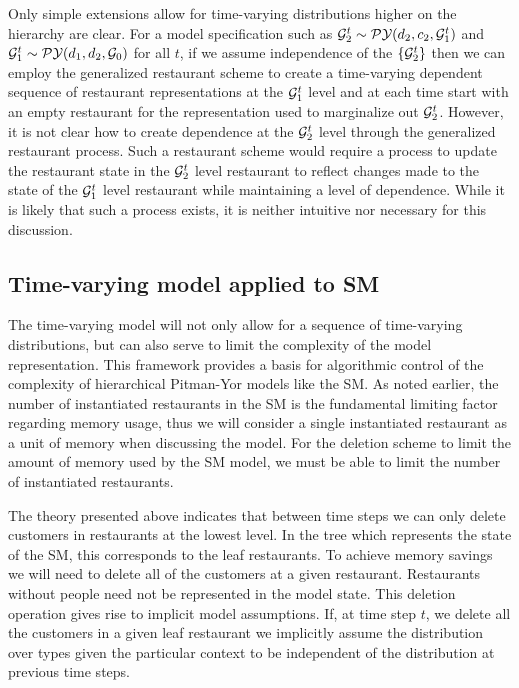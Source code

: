 Only simple extensions allow for time-varying distributions higher on the hierarchy are clear.  For a model specification such as $\G_2^t \sim \PY(d_2, c_2, \G_1^t)$ and $\G_1^t  \sim \PY(d_1,d_2,\G_0)$ for all $t$, if we assume independence of the $\{ \G_2^t \}$ then we can employ the generalized restaurant scheme to create a time-varying dependent sequence of restaurant representations at the  $\G_1^t$ level and at each time start with an empty restaurant for the representation used to marginalize out $\G_2^t$.  However, it is not clear how to create dependence at the $\G_2^t$ level through the generalized restaurant process.  Such a restaurant scheme would require a process to update the restaurant state in the $\G_2^t$ level restaurant to reflect changes made to the state of the $\G_1^t$ level restaurant while maintaining a level of dependence.  While it is likely that such a process exists, it is neither intuitive nor necessary for this discussion.

\subsection{Time-varying model applied to SM}

The time-varying model will not only allow for a sequence of time-varying distributions, but can also serve to limit the complexity of the model representation. This framework provides a basis for algorithmic control of the complexity of hierarchical Pitman-Yor models like the SM.  As noted earlier, the number of instantiated restaurants in the SM is the fundamental limiting factor regarding memory usage, thus we will consider a single instantiated restaurant as a unit of memory when discussing the model. For the deletion scheme to limit the amount of memory used by the SM model, we must be able to limit the number of instantiated restaurants.

The theory presented above indicates that between time steps we can only delete customers in restaurants at the lowest level.  In the tree which represents the state of the SM, this corresponds to the leaf restaurants.  To achieve memory savings we will need to delete all of the customers at a given restaurant.  Restaurants without people need not be represented in the model state.  This deletion operation gives rise to implicit model assumptions. If, at time step $t$, we delete all the customers in a given leaf restaurant we implicitly assume the distribution over types given the particular context to be independent of the distribution at previous time steps.

